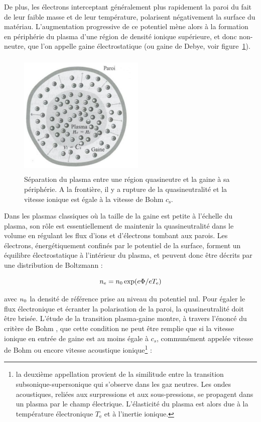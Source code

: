 \begin{refsection}
De plus, les électrons interceptant généralement
plus rapidement la paroi du fait de leur faible masse et de leur température,
polarisent négativement la surface du matériau.
L'augmentation progressive de ce potentiel mène alors à la formation en
périphérie du plasma d'une région de densité ionique supérieure, et donc
non-neutre, que l'on appelle gaine électrostatique (ou gaine de Debye, voir
figure~\ref{1-gaine}).

\begin{figure}[htbp]
\centering
\includegraphics[height=60mm,width=60mm]{figures/1-sheath.jpg}{\caption{Séparation
du plasma entre une région quasineutre et la gaine à sa
périphérie. A la frontière, il y a rupture de la quasineutralité et la vitesse
ionique est égale à la vitesse de Bohm
$c_\text{s}$\parencite{Rax}.}\label{1-gaine}}
\end{figure}

Dans les plasmas classiques où la taille de la gaine est petite
à l'échelle du plasma, son rôle est essentiellement de
maintenir la quasineutralité dans le volume en régulant les flux d'ions et
d'électrons tombant aux parois. Les électrons, énergétiquement confinés par le
potentiel de la surface, forment un équilibre électrostatique à l'intérieur du
plasma, et peuvent donc être décrits par une distribution de Boltzmann :

\begin{equation}
	n_\text{e}=n{_{0}}\exp(e\Phi/eT_\text{e})
\end{equation}

avec $n{_{0}}$ la densité de référence prise au niveau du potentiel nul.
Pour égaler le flux électronique et écranter la polarisation de la paroi, la
quasineutralité doit être brisée. L'étude de la transition plasma-gaine montre,
à travers l'énoncé du critère de Bohm \parencite{Stangeby}, que
cette condition ne peut être remplie que si la vitesse ionique en entrée de
gaine est au moins égale à $c_s$, communément appelée vitesse de Bohm ou encore
vitesse acoustique ionique\footnote{la deuxième appellation provient de la similitude entre la
transition subsonique-supersonique qui s'observe dans les gaz neutres. Les
ondes acoustiques, reliées aux surpressions et aux sous-pressions, se propagent
dans un plasma par le champ électrique. L'élasticité du plasma est alors due à
la température électronique $T_\text{e}$ et à l'inertie ionique.} :


\end{refsection}
